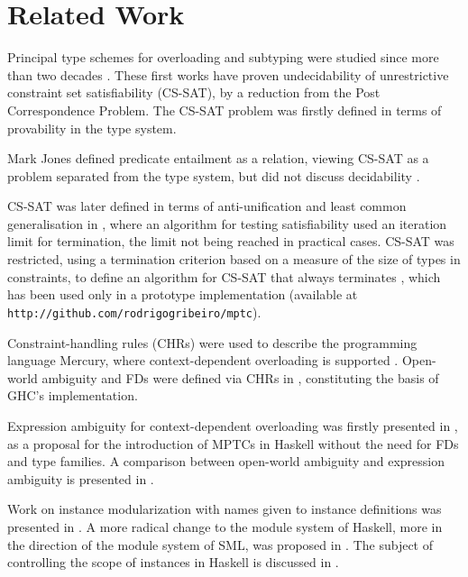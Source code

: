 \section{Related Work}
\label{sec:related-work}

Principal type schemes for overloading and subtyping were studied
since more than two decades \cite{Smith-Phd, VolpanoSmith91,
  Smith94principaltype}. These first works have proven undecidability
of unrestrictive constraint set satisfiability (CS-SAT), by a
reduction from the Post Correspondence Problem. The CS-SAT problem was
firstly defined in terms of provability in the type system.

Mark Jones defined predicate entailment as a relation, viewing CS-SAT
as a problem separated from the type system, but did not discuss
decidability \cite{MarkJones94a, SIQT}.

CS-SAT was later defined in terms of anti-unification and least common
generalisation in \cite{CS-SAT-PPDP04}, where an algorithm for testing
satisfiability used an iteration limit for termination, the limit not
being reached in practical cases. CS-SAT was restricted, using a
termination criterion based on a measure of the size of types in
constraints, to define an algorithm for CS-SAT that always terminates
\cite{JBCS-Terminating-CS-SAT}, which has been used only in a
prototype implementation (available at {\tt
  http://github.com/rodrigogribeiro/mptc}).

Constraint-handling rules (CHRs) were used to describe the programming
language Mercury, where context-dependent overloading is supported
\cite{TheoryOfOverloading}. Open-world ambiguity and FDs were defined
via CHRs in \cite{TheoryOfOverloading}, constituting the basis of
GHC's implementation.

Expression ambiguity for context-dependent overloading was firstly
presented in \cite{Solution-to-MPTC-SBLP-09}, as a proposal for the
introduction of MPTCs in Haskell without the need for FDs and type
families.  A comparison between open-world ambiguity and expression
ambiguity is presented in
\cite{JBCS-Ambiguity-and-constrained-polymorphism}.

Work on instance modularization with names given to instance
definitions was presented in \cite{Named-instances-2001}. A more
radical change to the module system of Haskell, more in the direction
of the module system of SML, was proposed in
\cite{Modular-type-classes-07}.  The subject of controlling the scope
of instances in Haskell is discussed in
\cite{Controlling-scope-instances,Extensible-superclasses-06}.
